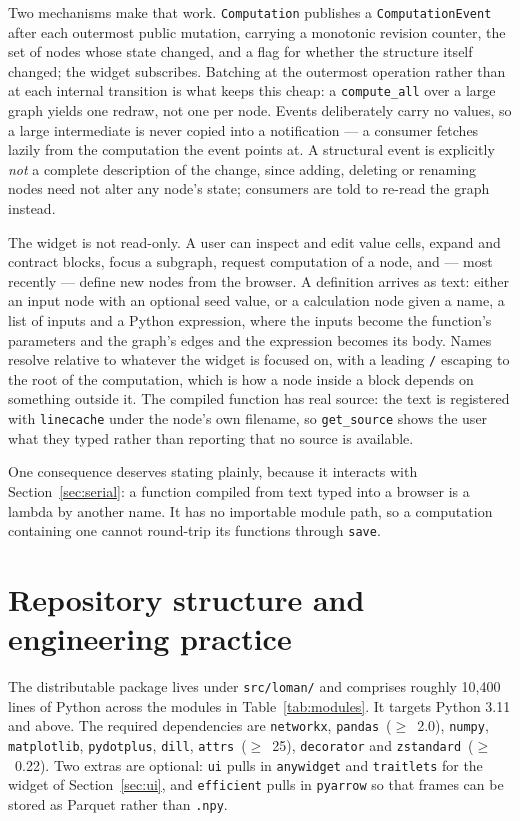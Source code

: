 \documentclass[11pt,a4paper]{article}
\newcommand{\code}[1]{\texttt{#1}}
\begin{document}
Two mechanisms make that work. \code{Computation} publishes a
\code{ComputationEvent} after each outermost public mutation, carrying a
monotonic revision counter, the set of nodes whose state changed, and a flag
for whether the structure itself changed; the widget subscribes. Batching at
the outermost operation rather than at each internal transition is what keeps
this cheap: a \code{compute\_all} over a large graph yields one redraw, not one
per node. Events deliberately carry no values, so a large intermediate is never
copied into a notification --- a consumer fetches lazily from the computation
the event points at. A structural event is explicitly \emph{not} a complete
description of the change, since adding, deleting or renaming nodes need not
alter any node's state; consumers are told to re-read the graph instead.

The widget is not read-only. A user can inspect and edit value cells, expand
and contract blocks, focus a subgraph, request computation of a node, and ---
most recently --- define new nodes from the browser. A definition arrives as
text: either an input node with an optional seed value, or a calculation node
given a name, a list of inputs and a Python expression, where the inputs become
the function's parameters and the graph's edges and the expression becomes its
body. Names resolve relative to whatever the widget is focused on, with a
leading \code{/} escaping to the root of the computation, which is how a node
inside a block depends on something outside it. The compiled function has real
source: the text is registered with \code{linecache} under the node's own
filename, so \code{get\_source} shows the user what they typed rather than
reporting that no source is available.

One consequence deserves stating plainly, because it interacts with
Section~\ref{sec:serial}: a function compiled from text typed into a browser is
a lambda by another name. It has no importable module path, so a computation
containing one cannot round-trip its functions through \code{save}.

\section{Repository structure and engineering practice}\label{sec:repo}

The distributable package lives under \code{src/loman/} and comprises roughly
10{,}400 lines of Python across the modules in Table~\ref{tab:modules}. It
targets Python 3.11 and above. The required dependencies are \code{networkx},
\code{pandas}~($\geq$~2.0), \code{numpy}, \code{matplotlib}, \code{pydotplus},
\code{dill}, \code{attrs}~($\geq$~25), \code{decorator} and
\code{zstandard}~($\geq$~0.22). Two extras are optional: \code{ui} pulls in
\code{anywidget} and \code{traitlets} for the widget of
Section~\ref{sec:ui}, and \code{efficient} pulls in \code{pyarrow} so that
frames can be stored as Parquet rather than \code{.npy}.
\end{document}
